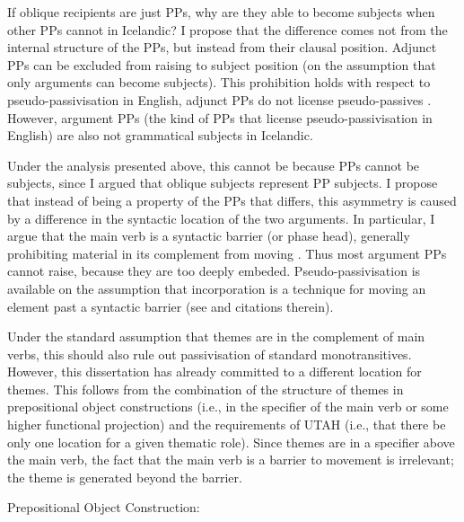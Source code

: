 If oblique recipients are just PPs, why are they able to become subjects when other PPs cannot in Icelandic? I propose that the difference comes not from the internal structure of the PPs, but instead from their clausal position. Adjunct PPs can be excluded from raising to subject position (on the assumption that only arguments can become subjects). This prohibition holds with respect to pseudo-passivisation in English, adjunct PPs do not license pseudo-passives \citep{Hornstein.1981,Baker.1988}. However, argument PPs (the kind of PPs that license pseudo-passivisation in English) are also not grammatical subjects in Icelandic.

Under the analysis presented above, this cannot be because PPs cannot be subjects, since I argued that oblique subjects represent PP subjects. I propose that instead of being a property of the PPs that differs, this asymmetry is caused by a difference in the syntactic location of the two arguments. In particular, I argue that the main verb is a syntactic barrier (or phase head), generally prohibiting material in its complement from moving \citep{Chomsky.2001}. Thus most argument PPs cannot raise, because they are too deeply embeded. Pseudo-passivisation is available on the assumption that incorporation is a technique for moving an element past a syntactic barrier (see \citealt{Alexiadou.2013b} and citations therein).

Under the standard assumption that themes are in the complement of main verbs, this should also rule out passivisation of standard monotransitives. However, this dissertation has already committed to a different location for themes. This follows from the combination of the structure of themes in prepositional object constructions (i.e., in the specifier of the main verb or some higher functional projection) and the requirements of UTAH (i.e., that there be only one location for a given thematic role). Since themes are in a specifier above the main verb, the fact that the main verb is a barrier to movement is irrelevant; the theme is generated beyond the barrier.

\begin{exe}
	 Prepositional Object Construction: \\
\end{exe}

